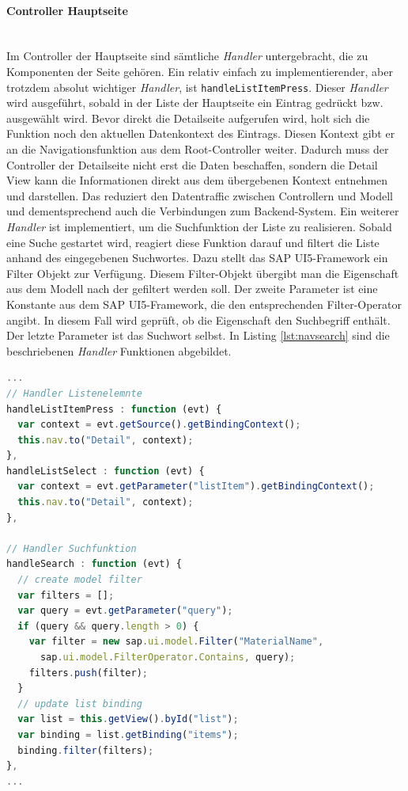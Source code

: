 \paragraph{Controller Hauptseite}$\;$ \\
Im Controller der Hauptseite sind sämtliche \textit{Handler} untergebracht, die zu Komponenten der Seite gehören. Ein relativ einfach zu implementierender, aber trotzdem absolut wichtiger \textit{Handler}, ist \texttt{handleListItemPress}. Dieser \textit{Handler} wird ausgeführt, sobald in der Liste der Hauptseite ein Eintrag gedrückt bzw. ausgewählt wird. Bevor direkt die Detailseite aufgerufen wird, holt sich die Funktion noch den aktuellen Datenkontext des Eintrags. Diesen Kontext gibt er an die Navigationsfunktion aus dem Root-Controller weiter. Dadurch muss der Controller der Detailseite nicht erst die Daten beschaffen, sondern die Detail View kann die Informationen direkt aus dem übergebenen Kontext entnehmen und darstellen. Das reduziert den Datentraffic zwischen Controllern und Modell und dementsprechend auch die Verbindungen zum Backend-System. Ein weiterer \textit{Handler} ist implementiert, um die Suchfunktion der Liste zu realisieren. Sobald eine Suche gestartet wird, reagiert diese Funktion darauf und filtert die Liste anhand des eingegebenen Suchwortes. Dazu stellt das SAP UI5-Framework ein Filter Objekt zur Verfügung. Diesem Filter-Objekt übergibt man die Eigenschaft aus dem Modell nach der gefiltert werden soll. Der zweite Parameter ist eine Konstante aus dem SAP UI5-Framework, die den entsprechenden Filter-Operator angibt. In diesem Fall wird geprüft, ob die Eigenschaft den Suchbegriff enthält. Der letzte Parameter ist das Suchwort selbst. In Listing \ref{lst:navsearch} sind die beschriebenen \textit{Handler} Funktionen abgebildet.

\vspace{1em}
\begin{lstlisting}[language=JavaScript, caption=Navigation und Suchfunktion der Hauptseite, label=lst:navsearch]
...  
// Handler Listenelemnte
handleListItemPress : function (evt) {
  var context = evt.getSource().getBindingContext();
  this.nav.to("Detail", context);
},
handleListSelect : function (evt) {
  var context = evt.getParameter("listItem").getBindingContext();
  this.nav.to("Detail", context);
},
  
// Handler Suchfunktion
handleSearch : function (evt) {		
  // create model filter
  var filters = [];
  var query = evt.getParameter("query");
  if (query && query.length > 0) {
    var filter = new sap.ui.model.Filter("MaterialName",
      sap.ui.model.FilterOperator.Contains, query);
    filters.push(filter);
  }	
  // update list binding
  var list = this.getView().byId("list");
  var binding = list.getBinding("items");
  binding.filter(filters);
},
...
\end{lstlisting}

